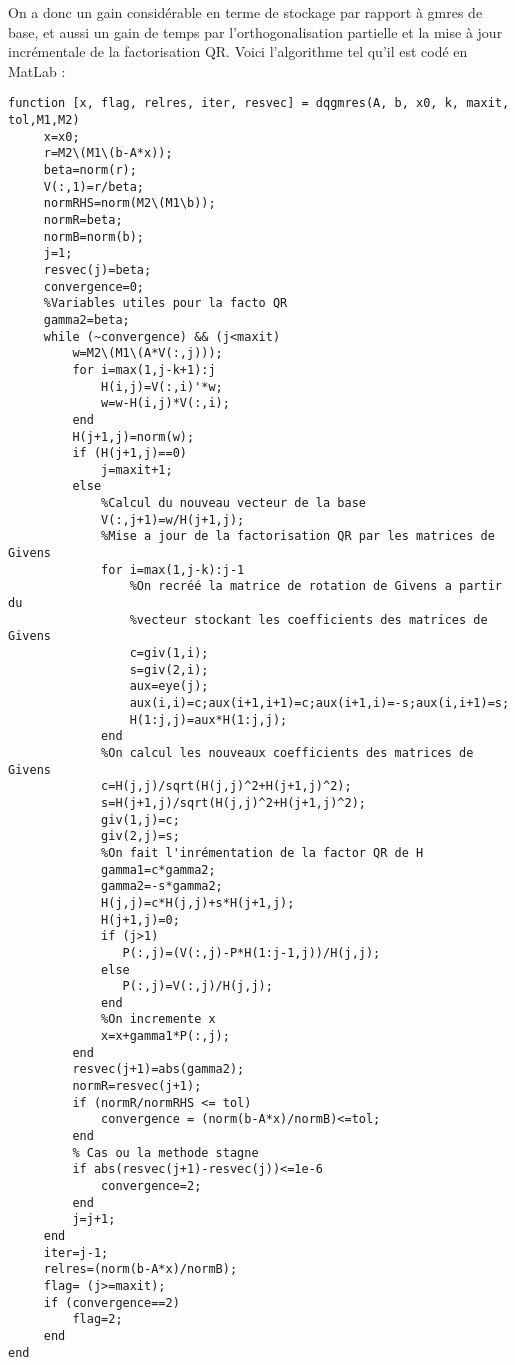 On a donc un gain considérable en terme de stockage par rapport à gmres de base, et aussi un gain de temps par l'orthogonalisation partielle et la mise à jour incrémentale de la factorisation QR.
Voici l’algorithme tel qu'il est codé en MatLab :
\begin{lstlisting}
function [x, flag, relres, iter, resvec] = dqgmres(A, b, x0, k, maxit, tol,M1,M2)
     x=x0;
     r=M2\(M1\(b-A*x));
     beta=norm(r);
     V(:,1)=r/beta;
     normRHS=norm(M2\(M1\b));
     normR=beta;
     normB=norm(b);
     j=1;
     resvec(j)=beta;
     convergence=0;
     %Variables utiles pour la facto QR
     gamma2=beta;
     while (~convergence) && (j<maxit) 
         w=M2\(M1\(A*V(:,j)));
         for i=max(1,j-k+1):j
             H(i,j)=V(:,i)'*w;
             w=w-H(i,j)*V(:,i);
         end
         H(j+1,j)=norm(w);
         if (H(j+1,j)==0)
             j=maxit+1;
         else
             %Calcul du nouveau vecteur de la base
             V(:,j+1)=w/H(j+1,j);
             %Mise a jour de la factorisation QR par les matrices de Givens
             for i=max(1,j-k):j-1
                 %On recréé la matrice de rotation de Givens a partir du
                 %vecteur stockant les coefficients des matrices de Givens
                 c=giv(1,i);
                 s=giv(2,i);
                 aux=eye(j);
                 aux(i,i)=c;aux(i+1,i+1)=c;aux(i+1,i)=-s;aux(i,i+1)=s;
                 H(1:j,j)=aux*H(1:j,j);
             end
             %On calcul les nouveaux coefficients des matrices de Givens
             c=H(j,j)/sqrt(H(j,j)^2+H(j+1,j)^2);
             s=H(j+1,j)/sqrt(H(j,j)^2+H(j+1,j)^2);
             giv(1,j)=c;
             giv(2,j)=s;
             %On fait l'inrémentation de la factor QR de H
             gamma1=c*gamma2;
             gamma2=-s*gamma2;
             H(j,j)=c*H(j,j)+s*H(j+1,j);
             H(j+1,j)=0;
             if (j>1)
                P(:,j)=(V(:,j)-P*H(1:j-1,j))/H(j,j);
             else
                P(:,j)=V(:,j)/H(j,j); 
             end
             %On incremente x
             x=x+gamma1*P(:,j);
         end
         resvec(j+1)=abs(gamma2);
         normR=resvec(j+1);
         if (normR/normRHS <= tol)
             convergence = (norm(b-A*x)/normB)<=tol;
         end
         % Cas ou la methode stagne
         if abs(resvec(j+1)-resvec(j))<=1e-6
             convergence=2;
         end
         j=j+1;
     end   
     iter=j-1;
     relres=(norm(b-A*x)/normB);
     flag= (j>=maxit);
     if (convergence==2)
         flag=2;
     end
end
\end{lstlisting}